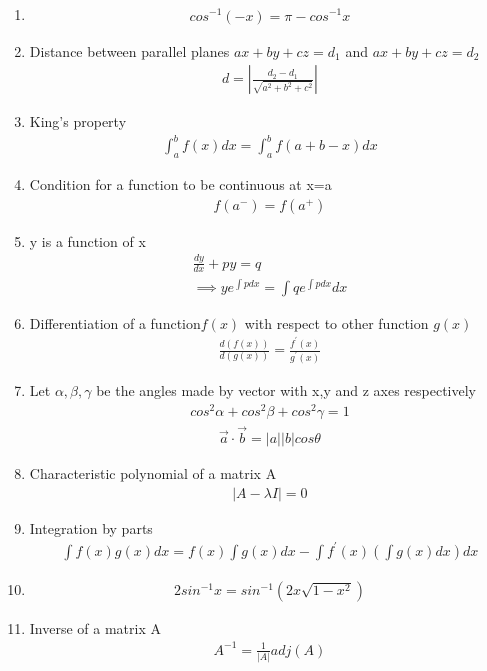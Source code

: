 \begin{enumerate}[label=\thesubsection.\arabic*, ref=\thesubsection.\theenumi]
\item 
\begin{align}
    cos^{-1}(-x)=\pi - cos^{-1}x \label{eq:ee26btech11222-prob 8_2}
\end{align}
 \item Distance between parallel planes $ax+by+cz=d_1$ and $ax+by+cz=d_2$
 \begin{align}
     d=\left | \frac{d_2-d_1}{\sqrt{a^2+b^2+c^2}}\right | \label{eq:ee26btech11222-prob 13}
 \end{align}
 \item King's property
 \begin{align}
     \int_a^b f(x)dx= \int_a^b f(a+b-x)dx \label{eq:ee26btech11222-prob 14}
 \end{align}
 \item Condition for a function to be continuous at x=a
 \begin{align}
     f(a^-)=f(a^+) \label{eq:ee26btech11222-prob 16}
 \end{align}
 \item y is a function of x
 \begin{align}
     \frac{dy}{dx}+py=q \\ \implies ye^{\int pdx}= \int q  e^{\int pdx}dx \label{eq:ee26btech11222-prob 17}
 \end{align} 
 \item Differentiation of a function$f(x)$ with respect to other function $g(x)$
 \begin{align}
     \frac{d(f(x))}{d(g(x))}=\frac{f^\prime (x)}{g^\prime (x)} \label{eq:ee26btech11222-prob 20}
 \end{align}
 \item Let $\alpha ,\beta, \gamma $ be the angles made by vector with x,y and z axes respectively 
 \begin{align} 
     cos^2\alpha+ cos^2\beta+cos^2\gamma=1 \label{eq:ee26btech11222-prob 19}
 \end{align}
 \begin{align}
 	\vec{a}\cdot\vec{b}=\vert{a}\vert{}\vert{}b\vert{}cos\theta \label{eq:ee26btech11222-prob-19_2}
 \end{align}
 \item Characteristic polynomial of a matrix A
 \begin{align}
    |A-\lambda I|=0 \label{eq:ee26btech11222-prob 22} 
 \end{align}
 \item Integration by parts 
 \begin{align}
     \int f(x)g(x)dx=f(x)\int g(x)dx-\int f^\prime (x)\left(\int g(x)dx\right) dx \label{eq:ee26btech11222-prob 21}
 \end{align}
 \item 
 \begin{align}
 	2sin^{-1}x= sin^{-1}(2x\sqrt{1-x^2}) \label{eq:ee26btech11222-prob-27}
 \end{align}
 \item Inverse of a matrix A
 \begin{align}
     A^{-1}= \frac{1}{\vert{}A\vert{}}adj(A) \label{eq:ee26btech11222-prob-34 }
 \end{align}


\end{enumerate}
